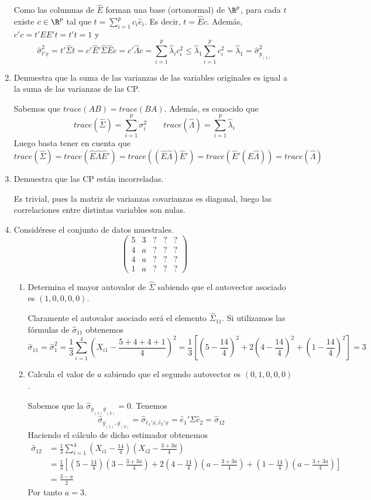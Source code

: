 \documentclass[twoside]{article}
\newcommand{\muestra}[1]{{\underline{#1}}}
\begin{document}
\begin{enumerate}
Como las columnas de $\hat{E}$ forman una base (ortonormal) de $\R^p$, para cada $t$ existe $c\in \R^p$ tal que $t = \sum_{i=1}^p c_i \hat{e}_i$. Es decir, $t=\hat{E}c$. Además, $c'c = t'EE't=t't=1$ y
$$
\hat{\sigma}^2_{t'\muestra{x}} = t'\hat{\Sigma}t =  c'\hat{E}'\hat{\Sigma}\hat{E}c = c'\hat{\Lambda}c = \sum_{i=1}^p \hat{\lambda}_i c_i^2 \leq \hat{\lambda}_1 \sum_{i=1}^p  c_i^2 = \hat{\lambda}_1 = \hat{\sigma}^2_{\muestra{y}_{(1)}}
$$
\item Demuestra que la suma de las varianzas de las variables originales es igual a la suma de las varianzas de las CP.

Sabemos que $trace(AB)=trace(BA)$. Además, es conocido que 
$$
trace(\hat{\Sigma}) = \sum_{i=1}^p \sigma_i^2 \qquad trace(\hat{\Lambda}) = \sum_{i=1}^p \hat{\lambda}_i
$$
Luego basta tener en cuenta que
$$
trace(\hat{\Sigma})=trace(\hat{E}\hat{\Lambda}\hat{E}')=trace((\hat{E}\hat{\Lambda})\hat{E}') = trace(\hat{E}'(\hat{E}\hat{\Lambda})) = trace(\hat{\Lambda})
$$
\item Demuestra que las CP están incorreladas.

Es trivial, pues la matriz de varianzas covarianzas es diagonal, luego las correlaciones entre distintas variables son nulas.
\item Considérese el conjunto de datos muestrales.
\[ \begin{pmatrix}5 & 3 & ? & ? & ?\\4 & a & ? & ? & ?\\4 & a & ? & ? & ?\\1 & a & ? & ? & ?\end{pmatrix}\]
\begin{enumerate}
	\item Determina el mayor autovalor de $\widehat{\Sigma}$ sabiendo que el autovector asociado es $(1,0,0,0,0)$.
	
	Claramente el autovalor asociado será el elemento $\hat{\Sigma}_{11}$. Si utilizamos las fórmulas de $\hat{\sigma}_{11}$ obtenemos
$$
\hat{\sigma}_{11}=\hat{\sigma}_1^2=\frac{1}{3}\sum_{i=1}^4(X_{i1}-\frac{5+4+4+1}{4})^2 = \frac{1}{3}\left[(5-\frac{14}{4})^2 +  2(4-\frac{14}{4})^2 + (1-\frac{14}{4})^2\right]= 3
$$

	\item Calcula el valor de $a$ sabiendo que el segundo autovector es $(0,1,0,0,0)$. 
	
Sabemos que la $\hat{\sigma}_{\muestra{y}_{(1)}\muestra{y}_{(2)}}=0$. Tenemos
$$
\hat{\sigma}_{\muestra{y}_{(1)},\muestra{y}_{(2)}} = \hat{\sigma}_{\hat{e}_1'\muestra{x},\hat{e}_2'\muestra{x}} = \hat{e}_1'\Sigma \hat{e}_2 = \hat{\sigma}_{12}
$$
Haciendo el cálculo de dicho estimador obtenemos
\begin{align*}
\hat{\sigma}_{12}&=\frac{1}{3}\sum_{i=1}^4(X_{i1}-\frac{14}{4})(X_{i2}-\frac{3+3a}{4})\\
&=\frac{1}{3}\left[(5-\frac{14}{4})(3-\frac{3+3a}{4})+2(4-\frac{14}{4})(a-\frac{3+3a}{4})+(1-\frac{14}{4})(a-\frac{3+3a}{4})\right]\\
&=\frac{3-a}{2}
\end{align*}
Por tanto $a=3$.

\end{enumerate}
\end{enumerate}
\newpage
\end{document}
